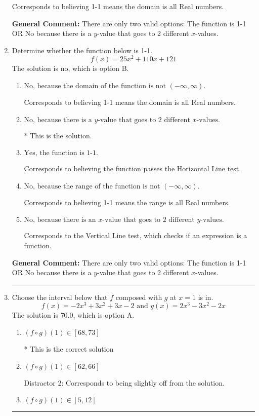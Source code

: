 \documentclass{extbook}[14pt]
\newcommand{\litem}[1]{\item #1

\rule{\textwidth}{0.4pt}}
\begin{document}
\begin{enumerate}
{\begin{enumerate}[label=\Alph*.]
Corresponds to believing 1-1 means the domain is all Real numbers.
\end{enumerate}

\textbf{General Comment:} There are only two valid options: The function is 1-1 OR No because there is a $y$-value that goes to 2 different $x$-values.
}
\litem{
Determine whether the function below is 1-1.
\[ f(x) = 25 x^2 + 110 x + 121 \]The solution is \( \text{no} \), which is option B.\begin{enumerate}[label=\Alph*.]
\item \( \text{No, because the domain of the function is not $(-\infty, \infty)$.} \)

Corresponds to believing 1-1 means the domain is all Real numbers.
\item \( \text{No, because there is a $y$-value that goes to 2 different $x$-values.} \)

* This is the solution.
\item \( \text{Yes, the function is 1-1.} \)

Corresponds to believing the function passes the Horizontal Line test.
\item \( \text{No, because the range of the function is not $(-\infty, \infty)$.} \)

Corresponds to believing 1-1 means the range is all Real numbers.
\item \( \text{No, because there is an $x$-value that goes to 2 different $y$-values.} \)

Corresponds to the Vertical Line test, which checks if an expression is a function.
\end{enumerate}

\textbf{General Comment:} There are only two valid options: The function is 1-1 OR No because there is a $y$-value that goes to 2 different $x$-values.
}
\litem{
Choose the interval below that $f$ composed with $g$ at $x=1$ is in.
\[ f(x) = -2x^{3} +3 x^{2} +3 x -2 \text{ and } g(x) = 2x^{3} -3 x^{2} -2 x \]The solution is \( 70.0 \), which is option A.\begin{enumerate}[label=\Alph*.]
\item \( (f \circ g)(1) \in [68, 73] \)

* This is the correct solution
\item \( (f \circ g)(1) \in [62, 66] \)

 Distractor 2: Corresponds to being slightly off from the solution.
\item \( (f \circ g)(1) \in [5, 12] \)


\end{enumerate}}
\end{enumerate}
\end{document}

